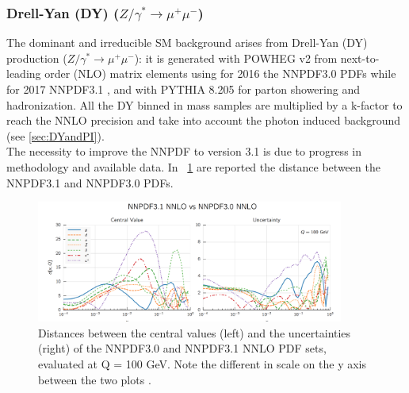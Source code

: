 \subsubsection{Drell-Yan (DY) ($Z/\gamma^*\to\mu^+\mu^-$)}
The dominant and irreducible SM background arises from Drell-Yan (DY) production ($Z/\gamma^*\to\mu^+\mu^-$): it is generated with POWHEG v2 \cite{NLO_1, NLO_2, NLO_3, NLO_4, NLO_5, NLO_6} from next-to-leading order (NLO) matrix elements using for 2016 the NNPDF3.0 \cite{NNLO} PDFs while for 2017 NNPDF3.1 \cite{NNLO_2017}, and with PYTHIA 8.205 \cite{PYTHIA} for parton showering and hadronization. All the DY binned in mass samples are multiplied by a k-factor to reach the NNLO precision and take into account the photon induced background (see \ref{sec:DYandPI}).\\
The necessity to improve the NNPDF to version 3.1 is due to progress in methodology and available data.
 In \figurename~\ref{NNPDF} are reported the distance between the NNPDF3.1 and NNPDF3.0 PDFs.
\begin{figure}[htbp]
\centering
\includegraphics[width=0.9\textwidth]{Images/NNPDF_30_31}
\caption{Distances between the central values (left) and the uncertainties (right) of the NNPDF3.0 and NNPDF3.1 NNLO PDF sets, evaluated at Q = 100 GeV. Note the different in scale on the y axis between the two plots \cite{NNLO_2017}.}
\label{NNPDF}
\end{figure}
